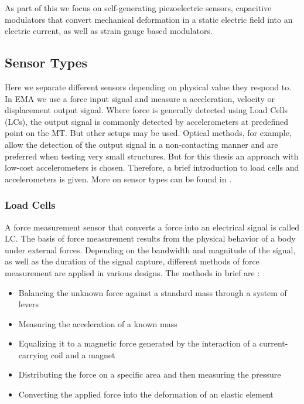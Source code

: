 As part of this we focus on self-generating piezoelectric sensors, capacitive modulators that convert mechanical deformation in a static electric field into an electric current, as well as strain gauge based modulators.

\subsection{Sensor Types}

Here we separate different sensors depending on physical value they respond to. In \ac{EMA} we use a force input signal and measure a acceleration, velocity or displacement output signal. Where force is generally detected using Load Cells (\acs{LC}s), the output signal is commonly detected by accelerometers at predefined point on the \ac{MT}. But other setups may be used. Optical methods, for example, allow the detection of the output signal in a non-contacting manner and are preferred when testing very small structures. But for this thesis an approach with low-cost accelerometers is chosen. Therefore, a brief introduction to load cells and accelerometers is given. More on sensor types can be found in \cite{webster2018measurement}.

\subsubsection{Load Cells}

A force measurement sensor that converts a force into an electrical signal is called \acf{LC}. The basis of force measurement results from the physical behavior of a body under external forces. Depending on the bandwidth and magnitude of the signal, as well as the duration of the signal capture, different methods of force measurement are applied in various designs. The methods in brief are \cite{webster2018measurement}:

\begin{itemize}
  \item Balancing the unknown force against a standard mass through a system of levers
  \item Measuring the acceleration of a known mass
  \item Equalizing it to a magnetic force generated by the interaction of a current-carrying coil and a magnet
  \item Distributing the force on a specific area and then measuring the pressure
  \item Converting the applied force into the deformation of an elastic element
\end{itemize}

